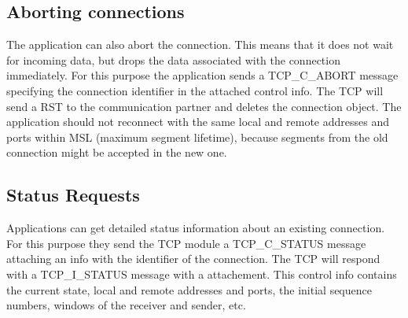 \subsection{Aborting connections}

The application can also abort the connection. This means that
it does not wait for incoming data, but drops the data associated
with the connection immediately. For this purpose the application
sends a TCP\_C\_ABORT message specifying the connection identifier
in the attached control info. The TCP will send a RST to the
communication partner and deletes the connection object. The application
should not reconnect with the same local and remote addresses and
ports within MSL (maximum segment lifetime), because segments
from the old connection might be accepted in the new one.

\subsection{Status Requests}

Applications can get detailed status information about an existing
connection. For this purpose they send the TCP module a TCP\_C\_STATUS
message attaching an  info with the identifier
of the connection. The TCP will respond with a TCP\_I\_STATUS message
with a  attachement. This control info
contains the current state, local and remote addresses and ports,
the initial sequence numbers, windows of the receiver and sender, etc.

% 
% 
% 
% 
% 

